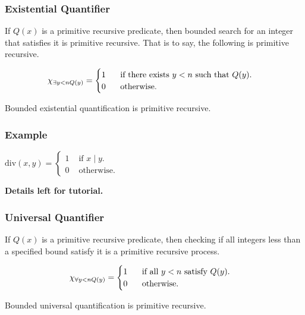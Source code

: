 \documentclass{beamer}
\theoremstyle{indentDefn} \newtheorem{defn}[]{Definition}
\begin{document}
\begin{frame}
	\frametitle{Existential Quantifier}

	If $Q(x)$ is a primitive recursive predicate, then bounded search for an integer that satisfies it is primitive recursive. That is to say, the following is primitive recursive.

	$$\chi_{\exists y < n Q(y)} =  \begin{cases}
		1 \hspace{0.5cm} \text{ if there exists } y < n \text{ such that } Q(y).\\
		0 \hspace{0.5cm} \text{ otherwise. }
	\end{cases}   $$

	\vspace{0.5cm}

	Bounded existential quantification is primitive recursive.

	\vspace{3cm}

\end{frame}

\begin{frame}
	\frametitle{Example}

	 $\text{div}(x,y) = 
	 \begin{cases}
		1 & \text{ if } x\mid y. \\
		0 & \text{ otherwise. }
	 \end{cases}$
	
	\vspace{6cm}

	\hspace{6cm} {\bf Details left for tutorial.}

\end{frame}


\begin{frame}
	\frametitle{Universal Quantifier}

	If $Q(x)$ is a primitive recursive predicate, then checking if all integers less than a specified bound satisfy it is a primitive recursive process. 

	$$\chi_{\forall y < n Q(y)} =  \begin{cases}
		1 \hspace{0.5cm} \text{ if all } y < n \text{ satisfy } Q(y).\\
		0 \hspace{0.5cm} \text{ otherwise.}
	\end{cases}   $$

	\vspace{0.5cm}

	Bounded universal quantification is primitive recursive.

	\vspace{3cm}


\end{frame}
\end{document}
